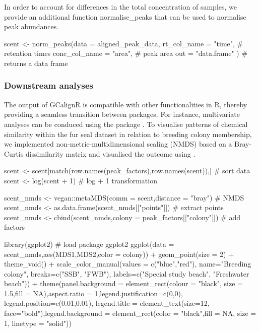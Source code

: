 In order to account for differences in the total concentration of
samples, we provide an additional function normalise\_peaks that can be
used to normalise peak abundances.

\begin{Schunk}
\begin{Sinput}
scent <- norm_peaks(data = aligned_peak_data,
                    rt_col_name = "time", # retention times
                    conc_col_name = "area", # peak area
                    out = "data.frame" ) # returns a data frame
\end{Sinput}
\end{Schunk}

\subsubsection{Downstream analyses}\label{downstream-analyses}

The output of GCalignR is compatible with other functionalities in R,
thereby providing a seamless transition between packages. For instance,
multivariate analyses can be conduced using the package . To
visualise patterns of chemical similarity within the fur seal dataset in
relation to breeding colony membership, we implemented
non-metric-multidimensional scaling (NMDS) based on a Bray-Curtis
dissimilarity matrix and visualised the outcome using
\href{https://CRAN.R-project.org/package=ggplot2}{}
\citep{Wickham.2009}.

\begin{Schunk}
\begin{Sinput}
scent <- scent[match(row.names(peak_factors),row.names(scent)),] # sort data 
scent <- log(scent + 1) # log + 1 transformation
\end{Sinput}
\end{Schunk}

\begin{Schunk}
\begin{Sinput}
scent_nmds <- vegan::metaMDS(comm = scent,distance = "bray") # NMDS
scent_nmds <- as.data.frame(scent_nmds[["points"]]) # extract points
scent_nmds <- cbind(scent_nmds,colony = peak_factors[["colony"]]) # add factors
\end{Sinput}
\end{Schunk}

\begin{Schunk}
\begin{Sinput}
library(ggplot2) # load package ggplot2
ggplot(data = scent_nmds,aes(MDS1,MDS2,color = colony)) +
    geom_point(size = 2) + 
    theme_void() + 
    scale_color_manual(values = c("blue","red"), 
                       name="Breeding colony",
                       breaks=c("SSB", "FWB"),
                       labels=c("Special study beach", 
                                "Freshwater beach")) +
    theme(panel.background = element_rect(colour = "black", size = 1.5,fill = NA),aspect.ratio = 1,legend.justification=c(0,0), legend.position=c(0.01,0.01), legend.title = element_text(size=12, face="bold"),legend.background = element_rect(color = "black",fill = NA, size = 1, linetype = "solid")) 
\end{Sinput}
\end{Schunk}

